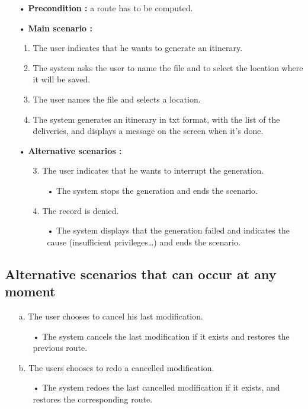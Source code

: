 \documentclass[paper=a4,fontsize=11pt]{report}
\numberwithin{equation}{section}		%
\numberwithin{figure}{section}		%
\numberwithin{table}{section}		%
\begin{document}
\begin{itemize}
  \item[•] \textbf{Precondition :} a route has to be computed.
  \item[•] \textbf{Main scenario :}
  \begin{enumerate}
    \item The user indicates that he wants to generate an itinerary.
    \item The system asks the user to name the file and to select the location where it will be saved.
    \item The user names the file and selects a location.
    \item The system generates an itinerary in txt format, with the list of the deliveries, and displays a message on the screen when it’s done.
  \end{enumerate}
  \item[•] \textbf{Alternative scenarios :}
  \begin{itemize}
    \item[3.] The user indicates that he wants to interrupt the generation.
    \begin{itemize}
      \item[•] The system stops the generation and ends the scenario.
    \end{itemize}
    \item[4.]  The record is denied.
    \begin{itemize}
      \item[•] The system displays that the generation failed and indicates the cause (insufficient privileges…) and ends the scenario.
    \end{itemize}
  \end{itemize}
\end{itemize}

\subsection{Alternative scenarios that can occur at any moment}
\label{subsec:alternative-scenarios-that-can-occur-at-any-moment}

\begin{itemize}
  \item[a.] The user chooses to cancel his last modification.
  \begin{itemize}
    \item[•] The system cancels the last modification if it exists and restores the previous route.
  \end{itemize}
  \item[b.] The users chooses to redo a cancelled modification.
  \begin{itemize}
    \item[•] The system redoes the last cancelled modification if it exists, and restores the corresponding route.
  \end{itemize}
\end{itemize}
\end{document}
